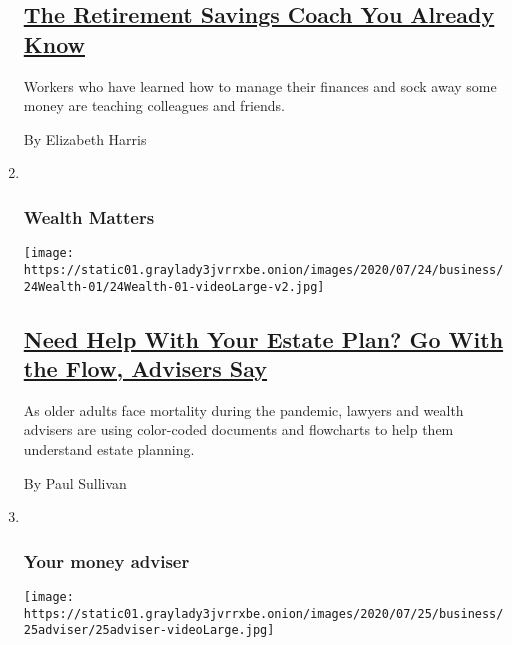 \begin{enumerate}
  \hypertarget{the-retirement-savings-coach-you-already-know}{%
  \subsection{\texorpdfstring{\href{/2020/07/25/business/retirement-savings-mentor.html}{The
  Retirement Savings Coach You Already
  Know}}{The Retirement Savings Coach You Already Know}}\label{the-retirement-savings-coach-you-already-know}}

  Workers who have learned how to manage their finances and sock away
  some money are teaching colleagues and friends.

  By Elizabeth Harris
\item ~
  \hypertarget{wealth-matters}{%
  \subsubsection{Wealth Matters}\label{wealth-matters}}

  \texttt{[image: https://static01.graylady3jvrrxbe.onion/images/2020/07/24/business/24Wealth-01/24Wealth-01-videoLarge-v2.jpg]}

  \hypertarget{need-help-with-your-estate-plan-go-with-the-flow-advisers-say}{%
  \subsection{\texorpdfstring{\href{/2020/07/24/your-money/need-help-with-your-estate-plan-go-with-the-flow-advisers-say.html}{Need
  Help With Your Estate Plan? Go With the Flow, Advisers
  Say}}{Need Help With Your Estate Plan? Go With the Flow, Advisers Say}}\label{need-help-with-your-estate-plan-go-with-the-flow-advisers-say}}

  As older adults face mortality during the pandemic, lawyers and wealth
  advisers are using color-coded documents and flowcharts to help them
  understand estate planning.

  By Paul Sullivan
\item ~
  \hypertarget{your-money-adviser}{%
  \subsubsection{Your money adviser}\label{your-money-adviser}}

  \texttt{[image: https://static01.graylady3jvrrxbe.onion/images/2020/07/25/business/25adviser/25adviser-videoLarge.jpg]}

  \hypertarget{16-states-go-ahead-with-back-to-school-sales-tax-holidays}{%
}
\end{enumerate}
